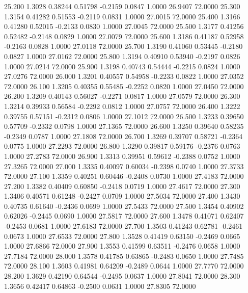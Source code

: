  25.200   1.3028   0.38244   0.51798  -0.2159   0.0847   1.0000  26.9407  72.0000
  25.300   1.3154   0.41282   0.51553  -0.2119   0.0831   1.0000  27.0015  72.0000
  25.400   1.3166   0.41280   0.52015  -0.2133   0.0830   1.0000  27.0045  72.0000
  25.500   1.3177   0.41256   0.52482  -0.2148   0.0829   1.0000  27.0079  72.0000
  25.600   1.3186   0.41187   0.52958  -0.2163   0.0828   1.0000  27.0118  72.0000
  25.700   1.3190   0.41060   0.53445  -0.2180   0.0827   1.0000  27.0162  72.0000
  25.800   1.3194   0.40910   0.53940  -0.2197   0.0826   1.0000  27.0214  72.0000
  25.900   1.3198   0.40743   0.54444  -0.2215   0.0824   1.0000  27.0276  72.0000
  26.000   1.3201   0.40557   0.54958  -0.2233   0.0822   1.0000  27.0352  72.0000
  26.100   1.3205   0.40355   0.55485  -0.2252   0.0820   1.0000  27.0450  72.0000
  26.200   1.3209   0.40143   0.56027  -0.2271   0.0817   1.0000  27.0579  72.0000
  26.300   1.3214   0.39933   0.56584  -0.2292   0.0812   1.0000  27.0757  72.0000
  26.400   1.3222   0.39755   0.57151  -0.2312   0.0806   1.0000  27.1012  72.0000
  26.500   1.3233   0.39650   0.57709  -0.2332   0.0798   1.0000  27.1365  72.0000
  26.600   1.3250   0.39640   0.58235  -0.2349   0.0787   1.0000  27.1808  72.0000
  26.700   1.3269   0.39707   0.58721  -0.2364   0.0775   1.0000  27.2293  72.0000
  26.800   1.3290   0.39817   0.59176  -0.2376   0.0763   1.0000  27.2783  72.0000
  26.900   1.3313   0.39951   0.59612  -0.2388   0.0752   1.0000  27.3265  72.0000
  27.000   1.3335   0.40097   0.60034  -0.2398   0.0740   1.0000  27.3733  72.0000
  27.100   1.3359   0.40251   0.60446  -0.2408   0.0730   1.0000  27.4183  72.0000
  27.200   1.3382   0.40409   0.60850  -0.2418   0.0719   1.0000  27.4617  72.0000
  27.300   1.3406   0.40571   0.61248  -0.2427   0.0709   1.0000  27.5034  72.0000
  27.400   1.3430   0.40735   0.61640  -0.2436   0.0699   1.0000  27.5433  72.0000
  27.500   1.3454   0.40902   0.62026  -0.2445   0.0690   1.0000  27.5817  72.0000
  27.600   1.3478   0.41071   0.62407  -0.2453   0.0681   1.0000  27.6183  72.0000
  27.700   1.3503   0.41243   0.62781  -0.2461   0.0673   1.0000  27.6533  72.0000
  27.800   1.3528   0.41419   0.63150  -0.2469   0.0665   1.0000  27.6866  72.0000
  27.900   1.3553   0.41599   0.63511  -0.2476   0.0658   1.0000  27.7184  72.0000
  28.000   1.3578   0.41785   0.63865  -0.2483   0.0650   1.0000  27.7485  72.0000
  28.100   1.3603   0.41981   0.64209  -0.2489   0.0644   1.0000  27.7770  72.0000
  28.200   1.3629   0.42190   0.64544  -0.2495   0.0637   1.0000  27.8041  72.0000
  28.300   1.3656   0.42417   0.64863  -0.2500   0.0631   1.0000  27.8305  72.0000
